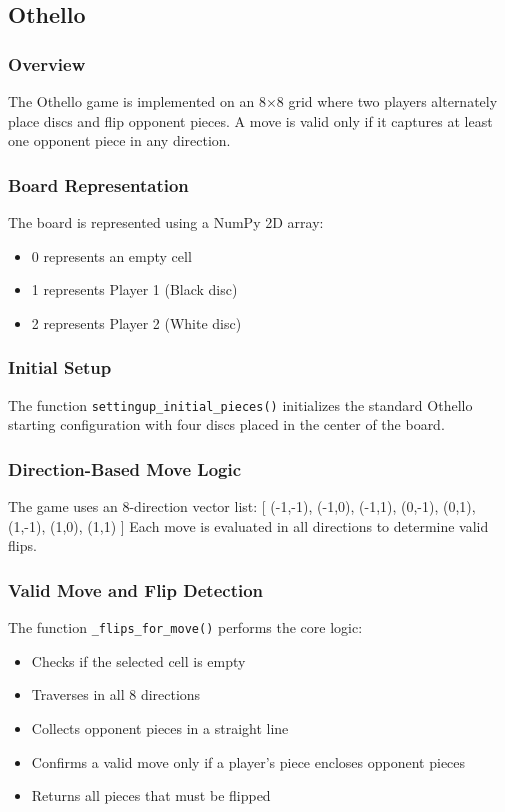 \documentclass[12pt,letterpaper]{article}
\begin{document}
\subsection{Othello}
\subsubsection{Overview}
The Othello game is implemented on an 8×8 grid where two players alternately place discs and 
flip opponent pieces. A move is valid only if it captures at least one opponent piece in any 
direction.
\subsubsection{Board Representation}
The board is represented using a NumPy 2D array:
\begin{itemize}
\item 0 represents an empty cell
\item 1 represents Player 1 (Black disc)
\item 2 represents Player 2 (White disc)
\end{itemize}
\subsubsection{Initial Setup}
The function \texttt{settingup\_initial\_pieces()} initializes the standard Othello starting 
configuration with four discs placed in the center of the board.

\subsubsection{Direction-Based Move Logic}
The game uses an 8-direction vector list:
[
(-1,-1), (-1,0), (-1,1), (0,-1), (0,1), (1,-1), (1,0), (1,1)
]
Each move is evaluated in all directions to determine valid flips.
\subsubsection{Valid Move and Flip Detection}
The function \texttt{\_flips\_for\_move()} performs the core logic:
\begin{itemize}
\item Checks if the selected cell is empty
\item Traverses in all 8 directions
\item Collects opponent pieces in a straight line
\item Confirms a valid move only if a player's piece encloses opponent pieces
\item Returns all pieces that must be flipped
\end{itemize}
\end{document}
